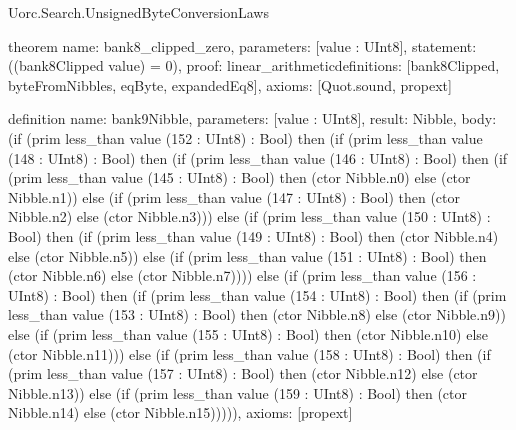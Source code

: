 \begin{lexlean}{Uorc.Search.UnsignedByteConversionLaws}
\begin{semanticmodule}
theorem{
  name: bank8_clipped_zero,
  parameters: [value : UInt8],
  statement: ((bank8Clipped value) = 0),
  proof: linear_arithmetic{definitions: [bank8Clipped, byteFromNibbles, eqByte, expandedEq8]},
  axioms: [Quot.sound, propext]
}

definition{
  name: bank9Nibble,
  parameters: [value : UInt8],
  result: Nibble,
  body: (if (prim less_than value (152 : UInt8) : Bool) then (if (prim less_than value (148 : UInt8) : Bool) then (if (prim less_than value (146 : UInt8) : Bool) then (if (prim less_than value (145 : UInt8) : Bool) then (ctor Nibble.n0) else (ctor Nibble.n1)) else (if (prim less_than value (147 : UInt8) : Bool) then (ctor Nibble.n2) else (ctor Nibble.n3))) else (if (prim less_than value (150 : UInt8) : Bool) then (if (prim less_than value (149 : UInt8) : Bool) then (ctor Nibble.n4) else (ctor Nibble.n5)) else (if (prim less_than value (151 : UInt8) : Bool) then (ctor Nibble.n6) else (ctor Nibble.n7)))) else (if (prim less_than value (156 : UInt8) : Bool) then (if (prim less_than value (154 : UInt8) : Bool) then (if (prim less_than value (153 : UInt8) : Bool) then (ctor Nibble.n8) else (ctor Nibble.n9)) else (if (prim less_than value (155 : UInt8) : Bool) then (ctor Nibble.n10) else (ctor Nibble.n11))) else (if (prim less_than value (158 : UInt8) : Bool) then (if (prim less_than value (157 : UInt8) : Bool) then (ctor Nibble.n12) else (ctor Nibble.n13)) else (if (prim less_than value (159 : UInt8) : Bool) then (ctor Nibble.n14) else (ctor Nibble.n15))))),
  axioms: [propext]
}


\end{semanticmodule}
\end{lexlean}
